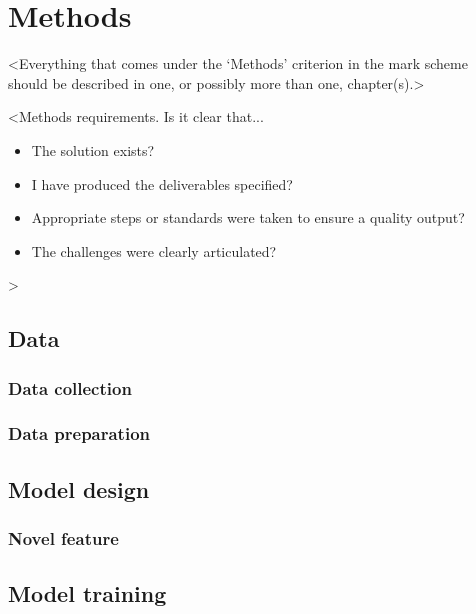 \chapter{Methods}
\label{chapter2}

<Everything that comes under the `Methods' criterion in the mark scheme should be described in one, or possibly more than one, chapter(s).>

<Methods requirements. Is it clear that...
\begin{itemize}
    \item The solution exists?
    \item I have produced the deliverables specified?
    \item Appropriate steps or standards were taken to ensure a quality output?
    \item The challenges were clearly articulated?
\end{itemize}
>

\section{Data}

\subsection{Data collection}
\lipsum[5]

\subsection{Data preparation}
\lipsum[6]

\section{Model design}
\lipsum[7]

\subsection{Novel feature}
\lipsum[8]

\section{Model training}
\lipsum[9]
